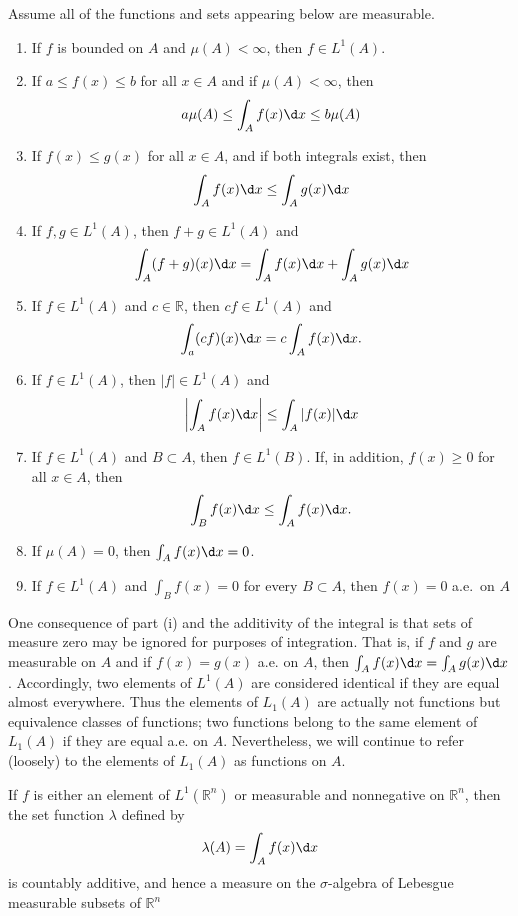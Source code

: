 \begin{theorem}
  Assume all of the functions and sets appearing below are measurable.
  \begin{enumerate}[label = (\alph*)]
    \item If $f$ is bounded on $A$ and $\mu(A)<\infty$, then $f \in L^1(A)$.
    \item If $a \leq f(x) \leq b$ for all $x \in A$ and if $\mu(A)<\infty$, then
      \[a \mu(A) \leq \int_A f(x) \d x \leq b \mu(A)\]
    \item If $f(x) \leq g(x)$ for all $x \in A$, and if both integrals exist, then
      \[\int_A f(x) \d x \leq \int_A g(x) \d x\]
    \item If $f, g \in L^1(A)$, then $f+g \in L^1(A)$ and
      \[\int_A(f+g)(x) \d x=\int_A f(x) \d x+\int_A g(x) \d x\]
    \item If $f \in L^1(A)$ and $c \in \mathbb{R}$, then $c f \in L^1(A)$ and
      \[
      \int_a(c f)(x) \d x=c \int_A f(x) \d x .
      \]
    \item If $f \in L^1(A)$, then $|f| \in L^1(A)$ and
      \[
      \left|\int_A f(x) \d x\right| \leq \int_A|f(x)| \d x
      \]
    \item If $f \in L^1(A)$ and $B \subset A$, then $f \in L^1(B)$.
      If, in addition, $f(x) \geq 0$ for all $x \in A$, then
      \[
      \int_B f(x) \d x \leq \int_A f(x) \d x .
      \]
    \item If $\mu(A)=0$, then $\int_A f(x) \d x=0$.
    \item If $f \in L^1(A)$ and $\int_B f(x)=0$ for every $B \subset A$,
      then $f(x)=0$ a.e.~on $A$
  \end{enumerate}
\end{theorem}

One consequence of part (i) and the additivity of the integral is that sets of measure zero may be ignored for purposes of integration. That is, if $f$ and $g$ are measurable on $A$ and if $f(x)=g(x)$ a.e. on $A$, then $\int_A f(x) \d x=\int_A g(x) \d x$. Accordingly, two elements of $L^1(A)$ are considered identical if they are equal almost everywhere. Thus the elements of $L_1(A)$ are actually not functions but equivalence classes of functions; two functions belong to the same element of $L_1(A)$ if they are equal a.e. on $A$. Nevertheless, we will continue to refer (loosely) to the elements of $L_1(A)$ as functions on $A$.

\begin{theorem}
  If $f$ is either an element of $L^1\left(\mathbb{R}^n\right)$ or measurable and nonnegative on $\mathbb{R}^n$, then the set function $\lambda$ defined by
  \[
  \lambda(A)=\int_A f(x) \d x
  \]
  is countably additive, and hence a measure on the $\sigma$-algebra of Lebesgue measurable subsets of $\mathbb{R}^n$
\end{theorem}


